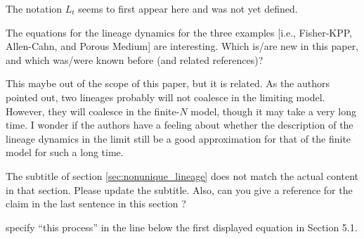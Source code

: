 
\begin{point}{}
The notation $L_t$ seems to first appear here and was not yet defined.
\end{point}


\begin{point}{}
    The equations for the lineage dynamics for the three examples [i.e., Fisher-KPP, Allen-Cahn, and Porous Medium] are interesting.
Which is/are new in this paper, and which was/were known before (and related references)?
\end{point}


\begin{point}{}
This maybe out of the scope of this paper, but it is related. As the authors pointed out, two
lineages probably will not coalesce in the limiting model. However, they will coalesce in
the finite-$N$ model, though it may take a very long time. I wonder if the authors have a
feeling about whether the description of the lineage dynamics in the limit still be a good
approximation for that of the finite model for such a long time.
\end{point}


\begin{point}{}
The subtitle of section \ref{sec:nonunique_lineage} does not match the actual content in that section. Please
update the subtitle. Also, can you give a reference for the claim in the last sentence in this
section \revref?
\end{point}


\begin{point}{\revref}
specify ``this process'' in the line below the first displayed equation in
Section 5.1.
\end{point}


